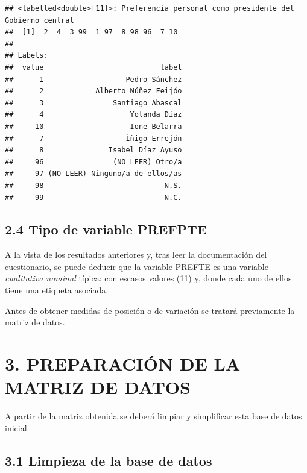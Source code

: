 \documentclass[
]{article}
\newenvironment{Shaded}{\begin{snugshade}}{\end{snugshade}}
\newcommand{\FunctionTok}[1]{\textcolor[rgb]{0.13,0.29,0.53}{\textbf{#1}}}
\newcommand{\NormalTok}[1]{#1}
\newcommand{\SpecialCharTok}[1]{\textcolor[rgb]{0.81,0.36,0.00}{\textbf{#1}}}
\begin{document}
\begin{Shaded}
\end{Shaded}

\begin{verbatim}
## <labelled<double>[11]>: Preferencia personal como presidente del Gobierno central
##  [1]  2  4  3 99  1 97  8 98 96  7 10
## 
## Labels:
##  value                           label
##      1                   Pedro Sánchez
##      2            Alberto Núñez Feijóo
##      3                Santiago Abascal
##      4                    Yolanda Díaz
##     10                    Ione Belarra
##      7                   Íñigo Errejón
##      8               Isabel Díaz Ayuso
##     96                (NO LEER) Otro/a
##     97 (NO LEER) Ninguno/a de ellos/as
##     98                            N.S.
##     99                            N.C.
\end{verbatim}

\hypertarget{tipo-de-variable-prefpte}{%
\subsection{2.4 Tipo de variable
PREFPTE}\label{tipo-de-variable-prefpte}}

A la vista de los resultados anteriores y, tras leer la documentación
del cuestionario, se puede deducir que la variable PREFTE es una
variable \emph{cualitativa nominal} típica: con escasos valores (11) y,
donde cada uno de ellos tiene una etiqueta asociada.

Antes de obtener medidas de posición o de variación se tratará
previamente la matriz de datos.

\newpage

\hypertarget{preparaciuxf3n-de-la-matriz-de-datos}{%
\section{3. PREPARACIÓN DE LA MATRIZ DE
DATOS}\label{preparaciuxf3n-de-la-matriz-de-datos}}

A partir de la matriz obtenida se deberá limpiar y simplificar esta base
de datos inicial.

\hypertarget{limpieza-de-la-base-de-datos}{%
\subsection{3.1 Limpieza de la base de
datos}\label{limpieza-de-la-base-de-datos}}
\end{document}
